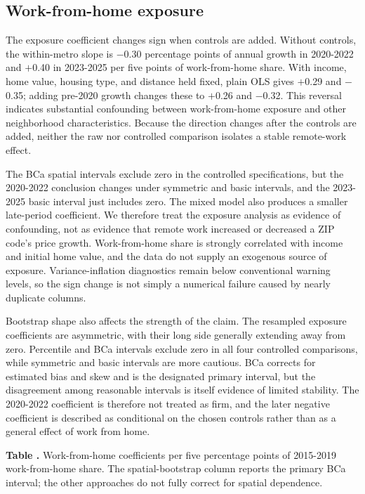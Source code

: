 \documentclass[11pt]{article}
\newcounter{tabnum}
\newcommand{\tab}[3]{%
  \begin{table}[!htbp]\centering
  \refstepcounter{tabnum}\label{#2}%
  {\small\raggedright\textbf{Table \thetabnum.} #3\par}\vspace{3pt}
  
  \end{table}}
\begin{document}
\FloatBarrier
\subsection{Work-from-home exposure}

The exposure coefficient changes sign when controls are added. Without controls, the within-metro slope is $-$0.30 percentage
points of annual growth in 2020-2022 and $+$0.40 in 2023-2025 per five points of work-from-home share. With income, home value,
housing type, and distance held fixed, plain OLS gives $+$0.29 and $-$0.35; adding pre-2020 growth changes these to $+$0.26 and
$-$0.32. This reversal indicates substantial confounding between work-from-home exposure and other neighborhood characteristics.
Because the direction changes after the controls are added, neither the raw nor controlled comparison isolates a stable remote-work
effect.

The BCa spatial intervals exclude zero in the controlled specifications, but the 2020-2022 conclusion changes under symmetric
and basic intervals, and the 2023-2025 basic interval just includes zero. The mixed model also produces a smaller late-period
coefficient. We therefore treat the exposure analysis as evidence of confounding, not as evidence that remote work increased or
decreased a ZIP code's price growth. Work-from-home share is strongly correlated with income and initial home value, and the data do
not supply an exogenous source of exposure. Variance-inflation diagnostics remain below conventional warning levels, so the sign
change is not simply a numerical failure caused by nearly duplicate columns.

Bootstrap shape also affects the strength of the claim. The resampled exposure coefficients are asymmetric, with their long side
generally extending away from zero. Percentile and BCa intervals exclude zero in all four controlled comparisons, while symmetric
and basic intervals are more cautious. BCa corrects for estimated bias and skew and is the designated primary interval, but the
disagreement among reasonable intervals is itself evidence of limited stability. The 2020-2022 coefficient is therefore not
treated as firm, and the later negative coefficient is described as conditional on the chosen controls rather than as a general
effect of work from home.

\tab{t_m_mixed}{tab:exposure}{Work-from-home coefficients per five percentage points of 2015-2019 work-from-home share. The
spatial-bootstrap column reports the primary BCa interval; the other approaches do not fully correct for spatial dependence.}
\end{document}
